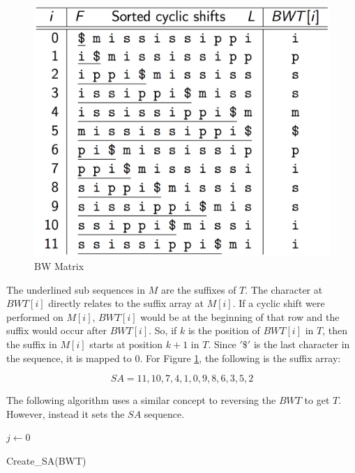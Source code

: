 \documentclass[11pt]{article}
\begin{document}
\begin{figure}[h!]
\begin{center}
\includegraphics[scale=0.4]{Figure1.png}
\caption{BW Matrix}
\label{fig:bwm}
\end{center}
\end{figure}


The underlined sub sequences in $M$ are the suffixes of $T$. The character at $BWT[i]$ directly relates to the suffix array at $M[i]$. If a cyclic shift were performed on $M[i]$, $BWT[i]$ would be at the beginning of that row and the suffix would occur after $BWT[i]$. So, if $k$ is the position of $BWT[i]$ in $T$, then the suffix in $M[i]$ starts at position $k+1$ in $T$. Since $'\$'$ is the last character in the sequence, it is mapped to $0$. For Figure \ref{fig:bwm}, the following is the suffix array:

$$
SA = { 11, 10, 7, 4, 1, 0, 9, 8, 6, 3, 5, 2 }
$$

\newpage

The following algorithm uses a similar concept to reversing the $BWT$ to get $T$. However, instead it sets the $SA$ sequence.

\begin{algorithm}
\DontPrintSemicolon
{}
\BlankLine

$j \leftarrow 0$
\label{cmt}
\BlankLine
{}

\caption{Create\_SA(BWT)}\label{algo_suffixArray}
\end{algorithm}
\end{document}
